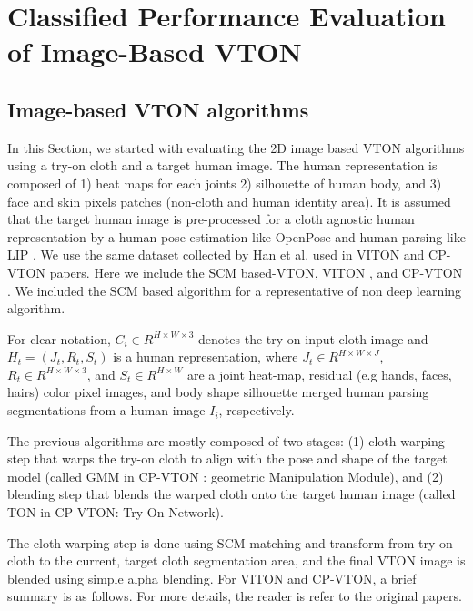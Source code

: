
\section{Classified Performance Evaluation of Image-Based VTON}

\subsection{Image-based VTON algorithms}

In this Section, we started with evaluating the 2D image based VTON algorithms using a try-on cloth and a target human image. The human representation is composed of 1) heat maps for each joints 2) silhouette of human body, and 3) face and skin pixels patches (non-cloth and human identity area). It is assumed that the target human image is pre-processed for a cloth agnostic human representation by a human pose estimation like OpenPose\cite{Cao2018OpenPoseRM} and human parsing like LIP \cite{Liang2018LookIP}. %
We use the same dataset collected by Han et al. used in VITON\cite{Han2017VITONAI} and CP-VTON\cite{Wang2018TowardCI} papers. Here we include the SCM based-VTON, VITON \cite{Han2017VITONAI}, and  CP-VTON \cite{Wang2018TowardCI}. We included the SCM based algorithm  for a representative of non deep learning algorithm.

For clear notation, $C_i \in R^{H \times W \times3} $ denotes the try-on input cloth image 
and $ H_t = (J_t, R_t, S_t)$ is a human representation, 
where $ J_t \in R^{H \times W \times J}$, $R_t \in R^{H \times W \times 3}$, and $ S_t \in R^{H \times W}$ are a joint heat-map, residual (e.g hands, faces, hairs) color pixel images, and body shape silhouette merged human parsing segmentations from a human image $I_i$, respectively.    

The previous algorithms are mostly composed of two stages: (1) cloth warping step that warps the try-on cloth to align with the pose and shape of the target model (called GMM in CP-VTON \cite{Wang2018TowardCI}: geometric Manipulation Module), and (2) blending step that blends the warped cloth onto the target human image (called TON in CP-VTON: Try-On Network). 

The cloth warping step is done using SCM matching and transform from try-on cloth to the current, target cloth segmentation area, and the final VTON image is blended using simple alpha blending. For VITON and CP-VTON, a brief summary is as follows. For more details, the reader is refer to the original papers.



